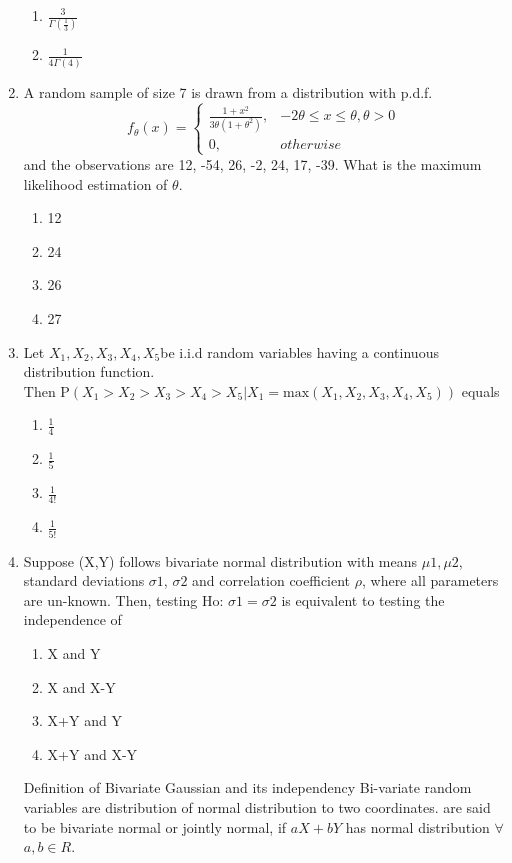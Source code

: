 \documentclass[journal,12pt,twocolumn]{IEEEtran}
\begin{document}
\begin{enumerate}[label=\arabic*.,ref=\theenumi]
\begin{enumerate}
\item $\frac{3}{\Gamma (\frac{1}{3})}$
\item $\frac{1}{4\Gamma(4) }$
\end{enumerate}
\item A random sample of size 7 is drawn from a distribution with p.d.f. \\ 
\[
    f_\theta(x)= 
\begin{cases}
\frac{1 + x^2}{3\theta(1+\theta^2)},& -2\theta \leq x \leq \theta, \theta > 0\\
    0,              & otherwise
\end{cases}
\]
and the observations are 12, -54, 26, -2, 24, 17, -39. What is the maximum likelihood estimation of \(\theta\).
\begin{enumerate}
\item 12
\item 24
\item 26
\item 27
\end{enumerate}
\item Let $X_1, X_2, X_3, X_4, X_5 $be i.i.d random variables having a continuous distribution function. $\text {Then P}(X_1>X_2>X_3>X_4>X_5|X_1 = \text {max}(X_1,X_2,X_3,X_4,X_5))$ equals
\begin{enumerate}
\item $\displaystyle\frac{1}{4}$
\item $\displaystyle\frac{1}{5}$
\item $\displaystyle\frac{1}{4!}$
\item $\displaystyle\frac{1}{5!}$
\end{enumerate}
\item Suppose (X,Y) follows bivariate normal distribution with means $\mu1, \mu2$, standard deviations $\sigma1$, $\sigma2$ and correlation coefficient $\rho$, where all parameters are un-known. Then, testing Ho: $\sigma1=\sigma2$ is equivalent to testing the independence of  
\begin{enumerate}
\item X and Y 
\item X and X-Y  
\item X+Y and Y 
\item X+Y and X-Y 
\end{enumerate}
\solution 

{Definition of Bivariate Gaussian and its independency}
Bi-variate random variables are distribution of normal distribution to two coordinates. are said to be bivariate normal or jointly normal, if $aX+bY$ has normal distribution $\forall$ $a,b \in R$.


\end{enumerate}
\end{document}
